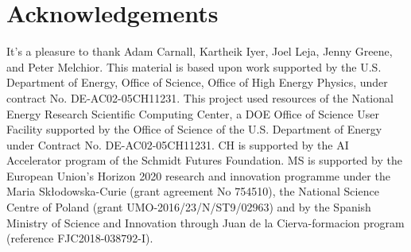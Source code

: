 \documentclass[12pt, letterpaper, preprint]{aastex63}
\begin{document}


 





\section*{Acknowledgements}
It's a pleasure to thank
    Adam Carnall, 
    Kartheik Iyer, 
    Joel Leja, 
    Jenny Greene, 
    and 
    Peter Melchior.
This material is based upon work supported by the U.S. Department of Energy,
Office of Science, Office of High Energy Physics, under contract No.
DE-AC02-05CH11231.  This project used resources of the National Energy Research
Scientific Computing Center, a DOE Office of Science User Facility supported by
the Office of Science of the U.S.  Department of Energy under Contract No.
DE-AC02-05CH11231. 
CH is supported by the AI Accelerator program of the Schmidt Futures Foundation.
MS is supported by the European Union's  Horizon 2020 research and innovation
programme under the Maria Sk\l{}odowska-Curie (grant agreement No 754510), the
National Science Centre of Poland (grant UMO-2016/23/N/ST9/02963) and by the
Spanish Ministry of Science and Innovation through Juan de la Cierva-formacion
program (reference FJC2018-038792-I).

\appendix



% 
% 


 
\end{document}
